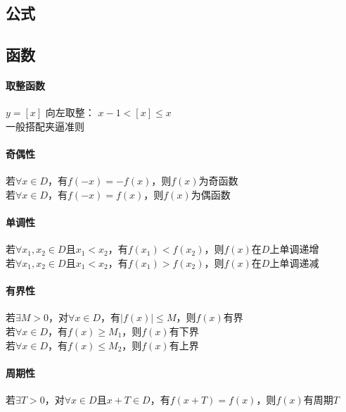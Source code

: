 \documentclass{article}
\begin{document}
\begin{flushleft}
\LARGE

\section{公式}

\subsection{函数}

\paragraph{取整函数}
$y=[x]$ 向左取整： $x-1<[x]\leq x$\\
一般搭配夹逼准则\\

\paragraph{奇偶性}
若$\forall x\in D$，有$f(-x)=-f(x)$，则$f(x)$为奇函数\\
若$\forall x\in D$，有$f(-x)=f(x)$，则$f(x)$为偶函数\\

\paragraph{单调性}
若$\forall x_1,x_2\in D$且$x_1<x_2$，有$f(x_1)<f(x_2)$，则$f(x)$在$D$上单调递增\\
若$\forall x_1,x_2\in D$且$x_1<x_2$，有$f(x_1)>f(x_2)$，则$f(x)$在$D$上单调递减\\

\paragraph{有界性}
若$\exists M>0$，对$\forall x\in D$，有$|f(x)|\le M$，则$f(x)$有界\\
\qquad 若$\forall x\in D$，有$f(x)\ge M_1$，则$f(x)$有下界\\
\qquad 若$\forall x\in D$，有$f(x)\le M_2$，则$f(x)$有上界\\

\paragraph{周期性}
若$\exists T>0$，对$\forall x\in D$且$x+T\in D$，有$f(x+T)=f(x)$，则$f(x)$有周期$T$\\



\end{flushleft}
\end{document}
